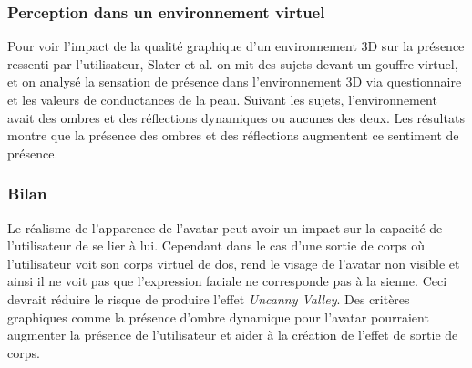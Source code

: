 \subsubsection{Perception dans un environnement virtuel}
Pour voir l'impact de la qualité graphique d'un environnement 3D sur la présence ressenti par l'utilisateur, Slater et al. \cite{sla09} on mit des sujets devant un gouffre virtuel, et on analysé la sensation de présence dans l'environnement 3D via questionnaire et les valeurs de conductances de la peau. Suivant les sujets, l'environnement avait des ombres et des réflections dynamiques ou aucunes des deux. Les résultats montre que la présence des ombres et des réflections augmentent ce sentiment de présence.
\subsubsection{Bilan}
Le réalisme de l'apparence de l'avatar peut avoir un impact sur la capacité de l'utilisateur de se lier à lui. Cependant dans le cas d'une sortie de corps où l'utilisateur voit son corps virtuel de dos, rend le visage de l'avatar non visible et ainsi il ne voit pas que l'expression faciale ne corresponde pas à la sienne. Ceci devrait réduire le risque de produire l'effet \emph{Uncanny Valley}. Des critères graphiques comme la présence d'ombre dynamique pour l'avatar pourraient augmenter la présence de l'utilisateur et aider à la création de l'effet de sortie de corps.